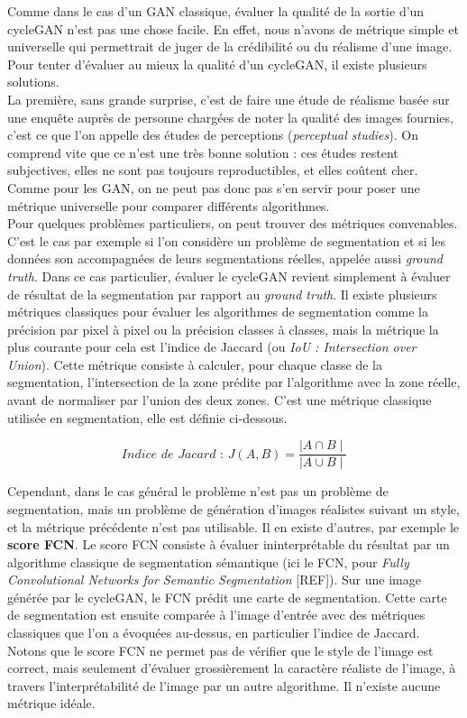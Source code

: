 Comme dans le cas d'un GAN classique, évaluer la qualité de la sortie d'un cycleGAN n'est pas une chose facile. En effet, nous n'avons de métrique simple et universelle qui permettrait de juger de la crédibilité ou du réalisme d'une image. Pour tenter d'évaluer au mieux la qualité d'un cycleGAN, il existe plusieurs solutions.\\

La première, sans grande surprise, c'est de faire une étude de réalisme basée sur une enquête auprès de personne chargées de noter la qualité des images fournies, c'est ce que l'on appelle des études de perceptions (\textit{perceptual studies}). On comprend vite que ce n'est une très bonne solution : ces études restent subjectives, elles ne sont pas toujours reproductibles, et elles coûtent cher. Comme pour les GAN, on ne peut pas donc pas s'en servir pour poser une métrique universelle pour comparer différents algorithmes.\\

Pour quelques problèmes particuliers, on peut trouver des métriques convenables. C'est le cas par exemple si l'on considère un problème de segmentation et si les données son accompagnées de leurs segmentations réelles, appelée aussi \textit{ground truth}. Dans ce cas particulier, évaluer le cycleGAN revient simplement à évaluer de résultat de la segmentation par rapport au \textit{ground truth}. Il existe plusieurs métriques classiques pour évaluer les algorithmes de segmentation comme la précision par pixel à pixel ou la précision classes à classes, mais la métrique la plus courante pour cela est l'indice de Jaccard (ou \textit{IoU : Intersection over Union}). Cette métrique consiste à calculer, pour chaque classe de la segmentation, l'intersection de la zone prédite par l'algorithme avec la zone réelle, avant de normaliser par l'union des deux zones. C'est une métrique classique utilisée en segmentation, elle est définie ci-dessous.

$$ \textit{Indice de Jacard : }J(A,B) = \frac{ \mid A \cap B \mid }{ \mid A \cup B \mid } $$

Cependant, dans le cas général le problème n'est pas un problème de segmentation, mais un problème de génération d'images réalistes suivant un style, et la métrique précédente n'est pas utilisable. Il en existe d'autres, par exemple le \textbf{score FCN}. Le score FCN consiste à évaluer ininterprétable du résultat par un algorithme classique de segmentation sémantique (ici le FCN, pour \textit{Fully Convolutional Networks for Semantic Segmentation} [REF]). Sur une image générée par le cycleGAN, le FCN prédit une carte de segmentation. Cette carte de segmentation est ensuite comparée à l’image d’entrée avec des métriques classiques que l'on a évoquées au-dessus, en particulier l'indice de Jaccard. Notons que le score FCN ne permet pas de vérifier que le style de l'image est correct, mais seulement d'évaluer grossièrement la caractère réaliste de l'image, à travers l'interprétabilité de l'image par un autre algorithme. Il n'existe aucune métrique idéale.


